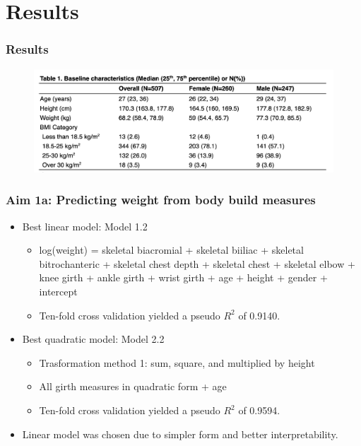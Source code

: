 \documentclass{beamer}
\begin{document}
\section{Results}

\begin{frame}
\frametitle{Results}

\begin{figure}
	\includegraphics[scale=0.35]{Table1.png}
	\caption{ }
	\label{fig:table1}
\end{figure}

\end{frame}

\begin{frame}
\frametitle{Aim 1a: Predicting weight from body build measures}
 
\begin{itemize}
	\item Best linear model: Model 1.2
		\begin{itemize}
			\item log(weight) = skeletal biacromial + skeletal biiliac + skeletal bitrochanteric + skeletal chest depth + skeletal chest + skeletal elbow + knee girth + ankle girth + wrist girth + age + height + gender + intercept 
			\item Ten-fold cross validation yielded a pseudo $R^2$ of 0.9140.
		\end{itemize}
	\item Best quadratic model: Model 2.2
		\begin{itemize}
			\item Trasformation method 1: sum, square, and multiplied by height
			\item All girth measures in quadratic form + age
			\item Ten-fold cross validation yielded a pseudo $R^2$ of 0.9594.
		\end{itemize}
	\item Linear model was chosen due to simpler form and better interpretability.  
\end{itemize}

\end{frame}
\end{document}
